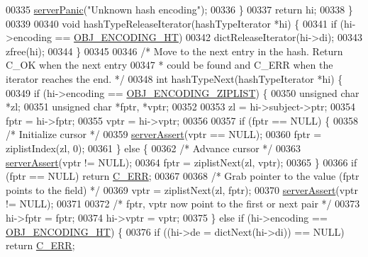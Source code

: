 \begin{DoxyCode}
00335         \hyperlink{server_8h_a11cc378e7778a830b41240578de3b204}{serverPanic}(\textcolor{stringliteral}{"Unknown hash encoding"});
00336     \}
00337     \textcolor{keywordflow}{return} hi;
00338 \}
00339 
00340 \textcolor{keywordtype}{void} hashTypeReleaseIterator(hashTypeIterator *hi) \{
00341     \textcolor{keywordflow}{if} (hi->encoding == \hyperlink{server_8h_a9c10219f68afc557d510d108257d238b}{OBJ\_ENCODING\_HT})
00342         dictReleaseIterator(hi->di);
00343     zfree(hi);
00344 \}
00345 
00346 \textcolor{comment}{/* Move to the next entry in the hash. Return C\_OK when the next entry}
00347 \textcolor{comment}{ * could be found and C\_ERR when the iterator reaches the end. */}
00348 \textcolor{keywordtype}{int} hashTypeNext(hashTypeIterator *hi) \{
00349     \textcolor{keywordflow}{if} (hi->encoding == \hyperlink{server_8h_aabf064ede983103f1fd0df2086e84eee}{OBJ\_ENCODING\_ZIPLIST}) \{
00350         \textcolor{keywordtype}{unsigned} \textcolor{keywordtype}{char} *zl;
00351         \textcolor{keywordtype}{unsigned} \textcolor{keywordtype}{char} *fptr, *vptr;
00352 
00353         zl = hi->subject->ptr;
00354         fptr = hi->fptr;
00355         vptr = hi->vptr;
00356 
00357         \textcolor{keywordflow}{if} (fptr == NULL) \{
00358             \textcolor{comment}{/* Initialize cursor */}
00359             \hyperlink{server_8h_a88114b5169b4c382df6b56506285e56a}{serverAssert}(vptr == NULL);
00360             fptr = ziplistIndex(zl, 0);
00361         \} \textcolor{keywordflow}{else} \{
00362             \textcolor{comment}{/* Advance cursor */}
00363             \hyperlink{server_8h_a88114b5169b4c382df6b56506285e56a}{serverAssert}(vptr != NULL);
00364             fptr = ziplistNext(zl, vptr);
00365         \}
00366         \textcolor{keywordflow}{if} (fptr == NULL) \textcolor{keywordflow}{return} \hyperlink{server_8h_af98ac28d5f4d23d7ed5985188e6fb7d1}{C\_ERR};
00367 
00368         \textcolor{comment}{/* Grab pointer to the value (fptr points to the field) */}
00369         vptr = ziplistNext(zl, fptr);
00370         \hyperlink{server_8h_a88114b5169b4c382df6b56506285e56a}{serverAssert}(vptr != NULL);
00371 
00372         \textcolor{comment}{/* fptr, vptr now point to the first or next pair */}
00373         hi->fptr = fptr;
00374         hi->vptr = vptr;
00375     \} \textcolor{keywordflow}{else} \textcolor{keywordflow}{if} (hi->encoding == \hyperlink{server_8h_a9c10219f68afc557d510d108257d238b}{OBJ\_ENCODING\_HT}) \{
00376         \textcolor{keywordflow}{if} ((hi->de = dictNext(hi->di)) == NULL) \textcolor{keywordflow}{return} \hyperlink{server_8h_af98ac28d5f4d23d7ed5985188e6fb7d1}{C\_ERR};

\end{DoxyCode}
